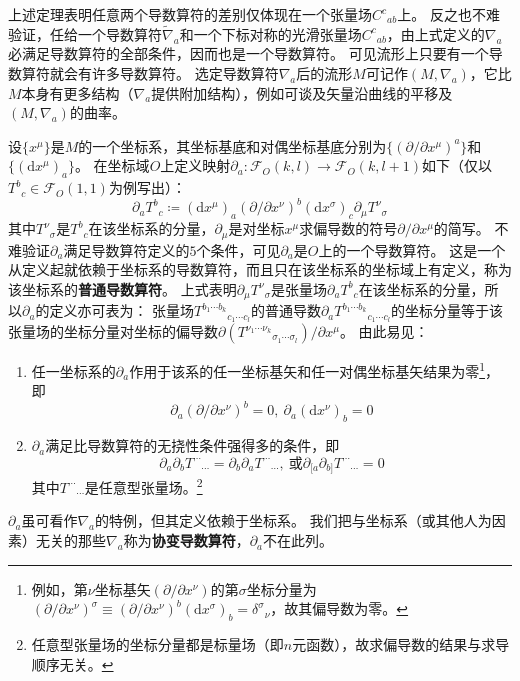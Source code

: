上述定理表明任意两个导数算符的差别仅体现在一个张量场$C^c{}_{ab}$上。
反之也不难验证，任给一个导数算符$\tilde\nabla_a$和一个下标对称的光滑张量场$C^c{}_{ab}$，由上式定义的$\nabla_a$必满足导数算符的全部条件，因而也是一个导数算符。
可见流形上只要有一个导数算符就会有许多导数算符。
选定导数算符$\nabla_a$后的流形$M$可记作$(M, \nabla_a)$，它比$M$本身有更多结构（$\nabla_a$提供附加结构），例如可谈及矢量沿曲线的平移及$(M, \nabla_a)$的曲率。

设$\{x^\mu\}$是$M$的一个坐标系，其坐标基底和对偶坐标基底分别为$\{(\partial / \partial x^\mu)^a\}$和$\{(\mathrm{d}x^\mu)_a\}$。
在坐标域$O$上定义映射$\partial_a \colon \mathscr{F}_O(k, l) \to \mathscr{F}_O(k, l + 1)$如下（仅以$T^b{}_c \in \mathscr{F}_O(1, 1)$为例写出）：
$$\partial_aT^b{}_c \coloneq (\mathrm{d}x^\mu)_a(\partial / \partial x^\nu)^b(\mathrm{d}x^\sigma)_c\partial_\mu T^\nu{}_\sigma$$
其中$T^\nu{}_\sigma$是$T^b{}_c$在该坐标系的分量，$\partial_\mu$是对坐标$x^\mu$求偏导数的符号$\partial / \partial x^\mu$的简写。
不难验证$\partial_a$满足导数算符定义的$5$个条件，可见$\partial_a$是$O$上的一个导数算符。
这是一个从定义起就依赖于坐标系的导数算符，而且只在该坐标系的坐标域上有定义，称为该坐标系的\textbf{普通导数算符}。
上式表明$\partial_\mu T^\nu{}_\sigma$是张量场$\partial_aT^b{}_c$在该坐标系的分量，所以$\partial_a$的定义亦可表为：
张量场$T^{b_1 \cdots b_k}{}_{c_1 \cdots c_l}$的普通导数$\partial_aT^{b_1 \cdots b_k}{}_{c_1 \cdots c_l}$的坐标分量等于该张量场的坐标分量对坐标的偏导数$\partial(T^{\nu_1 \cdots \nu_k}{}_{\sigma_1 \cdots \sigma_l}) / \partial x^\mu$。
由此易见：

\begin{enumerate}[（1）]
\item 任一坐标系的$\partial_a$作用于该系的任一坐标基矢和任一对偶坐标基矢结果为零\footnote{
例如，第$\nu$坐标基矢$(\partial / \partial x^\nu)$的第$\sigma$坐标分量为$(\partial / \partial x^\nu)^\sigma \equiv (\partial / \partial x^\nu)^b(\mathrm{d}x^\sigma)_b = \delta^\sigma{}_\nu$，故其偏导数为零。
}，即
$$\partial_a(\partial / \partial x^\nu)^b = 0, ~ \partial_a(\mathrm{d}x^\nu)_b = 0$$
\item $\partial_a$满足比导数算符的无挠性条件强得多的条件，即
$$\partial_a\partial_bT^{\cdots}{}_{\cdots} = \partial_b\partial_aT^{\cdots}{}_{\cdots}, ~ \text{或} \partial_{[a}\partial_{b]}T^{\cdots}{}_{\cdots} = 0$$
其中$T^{\cdots}{}_{\cdots}$是任意型张量场。\footnote{
任意型张量场的坐标分量都是标量场（即$n$元函数），故求偏导数的结果与求导顺序无关。
}
\end{enumerate}

$\partial_a$虽可看作$\nabla_a$的特例，但其定义依赖于坐标系。
我们把与坐标系（或其他人为因素）无关的那些$\nabla_a$称为\textbf{协变导数算符}，$\partial_a$不在此列。

